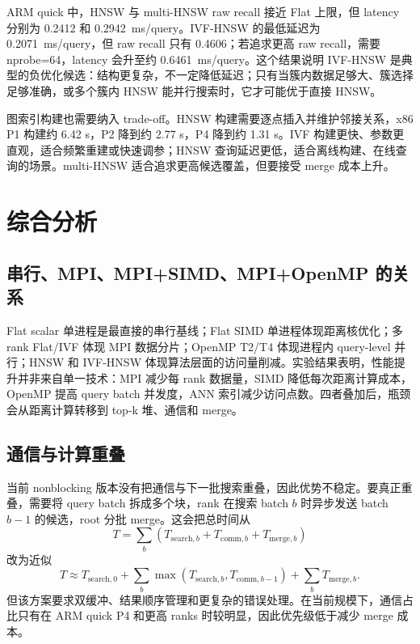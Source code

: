 \documentclass[11pt,a4paper]{article}
\newcommand{\msq}{ms/query}
\begin{document}
ARM quick 中，HNSW 与 multi-HNSW raw recall 接近 Flat 上限，但 latency 分别为 0.2412 和 0.2942~\msq。IVF-HNSW 的最低延迟为 0.2071~\msq，但 raw recall 只有 0.4606；若追求更高 raw recall，需要 nprobe=64，latency 会升至约 0.6461~\msq。这个结果说明 IVF-HNSW 是典型的负优化候选：结构更复杂，不一定降低延迟；只有当簇内数据足够大、簇选择足够准确，或多个簇内 HNSW 能并行搜索时，它才可能优于直接 HNSW。

图索引构建也需要纳入 trade-off。HNSW 构建需要逐点插入并维护邻接关系，x86 P1 构建约 6.42 s，P2 降到约 2.77 s，P4 降到约 1.31 s。IVF 构建更快、参数更直观，适合频繁重建或快速调参；HNSW 查询延迟更低，适合离线构建、在线查询的场景。multi-HNSW 适合追求更高候选覆盖，但要接受 merge 成本上升。

\section{综合分析}

\subsection{串行、MPI、MPI+SIMD、MPI+OpenMP 的关系}

Flat scalar 单进程是最直接的串行基线；Flat SIMD 单进程体现距离核优化；多 rank Flat/IVF 体现 MPI 数据分片；OpenMP T2/T4 体现进程内 query-level 并行；HNSW 和 IVF-HNSW 体现算法层面的访问量削减。实验结果表明，性能提升并非来自单一技术：MPI 减少每 rank 数据量，SIMD 降低每次距离计算成本，OpenMP 提高 query batch 并发度，ANN 索引减少访问点数。四者叠加后，瓶颈会从距离计算转移到 top-k 堆、通信和 merge。

\subsection{通信与计算重叠}

当前 nonblocking 版本没有把通信与下一批搜索重叠，因此优势不稳定。要真正重叠，需要将 query batch 拆成多个块，rank 在搜索 batch $b$ 时异步发送 batch $b-1$ 的候选，root 分批 merge。这会把总时间从
\[
T=\sum_b (T_{\mathrm{search},b}+T_{\mathrm{comm},b}+T_{\mathrm{merge},b})
\]
改为近似
\[
T\approx T_{\mathrm{search},0}+\sum_b \max(T_{\mathrm{search},b},T_{\mathrm{comm},b-1})+\sum_b T_{\mathrm{merge},b}.
\]
但该方案要求双缓冲、结果顺序管理和更复杂的错误处理。在当前规模下，通信占比只有在 ARM quick P4 和更高 ranks 时较明显，因此优先级低于减少 merge 成本。
\end{document}

